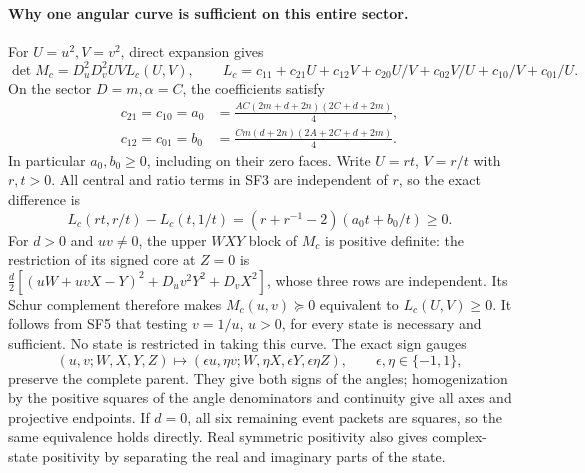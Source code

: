 \paragraph{Why one angular curve is sufficient on this entire sector.}
For $U=u^2,V=v^2$, direct expansion gives
\[
\det M_c=D_u^2D_v^2UV L_c(U,V),\qquad
L_c=c_{11}+c_{21}U+c_{12}V+c_{20}U/V+c_{02}V/U+c_{10}/V+c_{01}/U.
\tag{SF3}
\]
On the sector $D=m,\alpha=C$, the coefficients satisfy
\[
\begin{aligned}
c_{21}=c_{10}=a_0
 &=\frac{AC(2m+d+2n)(2C+d+2m)}4,\\
c_{12}=c_{01}=b_0
 &=\frac{Cm(d+2n)(2A+2C+d+2m)}4.
\end{aligned}
\tag{SF4}
\]
In particular $a_0,b_0\geq0$, including on their zero faces.  Write
$U=rt$, $V=r/t$ with $r,t>0$.  All central and ratio terms in SF3
are independent of $r$, so the exact difference is
\[
L_c(rt,r/t)-L_c(t,1/t)
 =(r+r^{-1}-2)(a_0t+b_0/t)\geq0.
\tag{SF5}
\]
For $d>0$ and $uv\ne0$, the upper $WXY$ block of $M_c$ is positive
definite: the restriction of its signed core at $Z=0$ is
$\tfrac d2[(uW+uvX-Y)^2+D_uv^2Y^2+D_vX^2]$, whose three rows
are independent.  Its Schur complement therefore makes
$M_c(u,v)\succeq0$ equivalent to $L_c(U,V)\geq0$.
It follows from SF5 that testing $v=1/u$, $u>0$, for every state is
necessary and sufficient.  No state is restricted in taking this curve.
The exact sign gauges
\[
(u,v;W,X,Y,Z)\longmapsto
(\epsilon u,\eta v;W,\eta X,\epsilon Y,\epsilon\eta Z),
\qquad \epsilon,\eta\in\{-1,1\},
\]
preserve the complete parent.  They give both signs of the angles;
homogenization by the positive squares of the angle denominators and
continuity give all axes and projective endpoints.  If $d=0$, all six
remaining event packets are squares, so the same equivalence holds
directly.  Real symmetric positivity also gives complex-state
positivity by separating the real and imaginary parts of the state.

